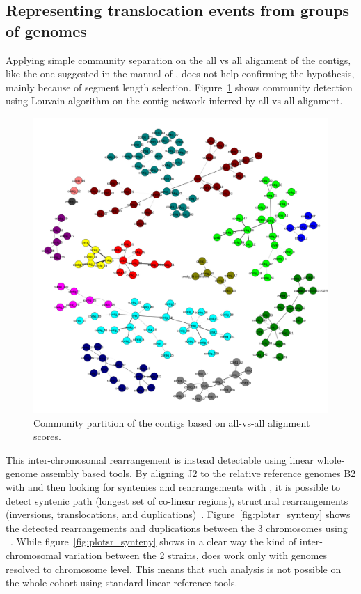 \subsection{Representing translocation events from groups of genomes}
Applying simple community separation on the all vs all alignment of the contigs, like the one suggested in the manual of \pggb, does not help confirming the hypothesis, mainly because of segment length selection. Figure~\ref{fig:lodelo_communities} shows community detection using Louvain algorithm on the contig network inferred by all vs all alignment.
\begin{figure}[h!]
	\centering
	\includegraphics[width=.4\linewidth]{figures/lodelo/alingment_communities.pdf}
	\caption[Community partition of the contigs to detect inter-chromosome events.]{Community partition of the contigs based on all-vs-all alignment scores.}
	\label{fig:lodelo_communities}
\end{figure}
This inter-chromosomal rearrangement is instead detectable using linear whole-genome assembly based tools. By aligning J2 to the relative reference genomes B2 with \wfmash and then looking for syntenies and rearrangements with \syri, it is possible to detect syntenic path (longest set of co-linear regions), structural rearrangements (inversions, translocations, and duplications)~\cite{syri}. Figure~\ref{fig:plotsr_synteny} shows the detected rearrangements and duplications between the 3 chromosomes using \plotsr~\cite{plotsr}.
While figure~\ref{fig:plotsr_synteny} shows in a clear way the kind of inter-chromosomal variation between the 2 strains, \syri does work only with genomes resolved to chromosome level. This means that such analysis is not possible on the whole cohort using standard linear reference tools. 
